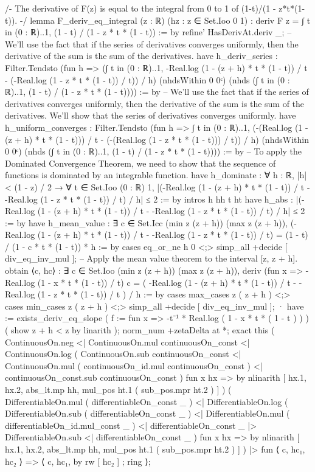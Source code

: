 /-
The derivative of F(z) is equal to the integral from 0 to 1 of (1-t)/(1 - z*t*(1-t)).
-/
lemma F_deriv_eq_integral (z : ℝ) (hz : z ∈ Set.Ioo 0 1) :
  deriv F z = ∫ t in (0 : ℝ)..1, (1 - t) / (1 - z * t * (1 - t)) := by
    refine' HasDerivAt.deriv _;
    -- We'll use the fact that if the series of derivatives converges uniformly, then the derivative of the sum is the sum of the derivatives.
    have h_deriv_series : Filter.Tendsto (fun h => (∫ t in (0 : ℝ)..1, -Real.log (1 - (z + h) * t * (1 - t)) / t - (-Real.log (1 - z * t * (1 - t)) / t)) / h) (nhdsWithin 0 {0}ᶜ) (nhds (∫ t in (0 : ℝ)..1, (1 - t) / (1 - z * t * (1 - t)))) := by
      -- We'll use the fact that if the series of derivatives converges uniformly, then the derivative of the sum is the sum of the derivatives. We'll show that the series of derivatives converges uniformly.
      have h_uniform_converges : Filter.Tendsto (fun h => ∫ t in (0 : ℝ)..1, (-(Real.log (1 - (z + h) * t * (1 - t))) / t - (-(Real.log (1 - z * t * (1 - t))) / t)) / h) (nhdsWithin 0 {0}ᶜ) (nhds (∫ t in (0 : ℝ)..1, (1 - t) / (1 - z * t * (1 - t)))) := by
        -- To apply the Dominated Convergence Theorem, we need to show that the sequence of functions is dominated by an integrable function.
        have h_dominate : ∀ h : ℝ, |h| < (1 - z) / 2 → ∀ t ∈ Set.Ioo (0 : ℝ) 1, |(-Real.log (1 - (z + h) * t * (1 - t)) / t - -Real.log (1 - z * t * (1 - t)) / t) / h| ≤ 2 := by
          intros h hh t ht
          have h_abs : |(-Real.log (1 - (z + h) * t * (1 - t)) / t - -Real.log (1 - z * t * (1 - t)) / t) / h| ≤ 2 := by
            have h_mean_value : ∃ c ∈ Set.Icc (min z (z + h)) (max z (z + h)), (-Real.log (1 - (z + h) * t * (1 - t)) / t - -Real.log (1 - z * t * (1 - t)) / t) = (1 - t) / (1 - c * t * (1 - t)) * h := by
              cases eq_or_ne h 0 <;> simp_all +decide [ div_eq_inv_mul ];
              -- Apply the mean value theorem to the interval [z, z + h].
              obtain ⟨c, hc⟩ : ∃ c ∈ Set.Ioo (min z (z + h)) (max z (z + h)), deriv (fun x => -Real.log (1 - x * t * (1 - t)) / t) c = ( -Real.log (1 - (z + h) * t * (1 - t)) / t - -Real.log (1 - z * t * (1 - t)) / t ) / h := by
                cases max_cases z ( z + h ) <;> cases min_cases z ( z + h ) <;> simp_all +decide [ div_eq_inv_mul ];
                · have := exists_deriv_eq_slope ( f := fun x => -t⁻¹ * Real.log ( 1 - x * t * ( 1 - t ) ) ) ( show z + h < z by linarith );
                  norm_num +zetaDelta at *;
                  exact this ( ContinuousOn.neg <| ContinuousOn.mul continuousOn_const <| ContinuousOn.log ( ContinuousOn.sub continuousOn_const <| ContinuousOn.mul ( continuousOn_id.mul continuousOn_const ) <| continuousOn_const.sub continuousOn_const ) fun x hx => by nlinarith [ hx.1, hx.2, abs_lt.mp hh, mul_pos ht.1 ( sub_pos.mpr ht.2 ) ] ) ( DifferentiableOn.mul ( differentiableOn_const _ ) <| DifferentiableOn.log ( DifferentiableOn.sub ( differentiableOn_const _ ) <| DifferentiableOn.mul ( differentiableOn_id.mul_const _ ) <| differentiableOn_const _ |> DifferentiableOn.sub <| differentiableOn_const _ ) fun x hx => by nlinarith [ hx.1, hx.2, abs_lt.mp hh, mul_pos ht.1 ( sub_pos.mpr ht.2 ) ] ) |> fun ⟨ c, hc₁, hc₂ ⟩ => ⟨ c, hc₁, by rw [ hc₂ ] ; ring ⟩;
